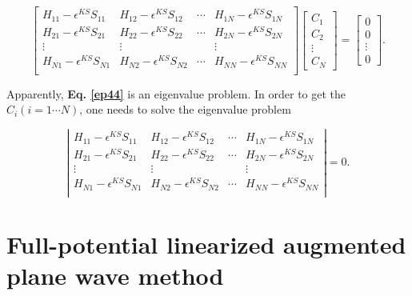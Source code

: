 \documentclass[a4paper, 12pt, titlepage,oneside,drop]{kthesis}
\begin{document}
\begin{equation}\label{ep44}
\left[
\begin{matrix}
    H_{11} - \epsilon^{KS}S_{11} & H_{12} - \epsilon^{KS}S_{12} & \cdots & H_{1N} - \epsilon^{KS}S_{1N} \\
    H_{21} - \epsilon^{KS}S_{21} & H_{22} - \epsilon^{KS}S_{22} & \cdots & H_{2N} - \epsilon^{KS}S_{2N} \\
    \vdots               & \vdots               &        & \vdots               \\
  H_{N1} - \epsilon^{KS}S_{N1} & H_{N2} - \epsilon^{KS}S_{N2} & \cdots & H_{NN} - \epsilon^{KS}S_{NN} \\
\end{matrix} \right] \left[ \begin{array}{c} C_1 \\ C_2 \\ \vdots \\ C_N\end{array} \right]
= \left[ \begin{array}{c} 0 \\ 0 \\ \vdots \\ 0 \end{array} \right].
\end{equation}

Apparently, \textbf{Eq. \ref{ep44}} is an eigenvalue problem. In order to get the $C_{i} (i = 1 \cdots N)$, one needs to solve the eigenvalue problem

\begin{equation}\label{ep4}
\left|
\begin{matrix}
    H_{11} - \epsilon^{KS}S_{11} & H_{12} - \epsilon^{KS}S_{12} & \cdots & H_{1N} - \epsilon^{KS}S_{1N} \\
   H_{21} - \epsilon^{KS}S_{21} & H_{22} - \epsilon^{KS}S_{22} & \cdots & H_{2N} - \epsilon^{KS}S_{2N} \\
    \vdots               & \vdots               &        & \vdots               \\
  H_{N1} - \epsilon^{KS}S_{N1} & H_{N2} - \epsilon^{KS}S_{N2} & \cdots & H_{NN} - \epsilon^{KS}S_{NN} \\
\end{matrix} \right|
 = 0.
\end{equation}

\section{Full-potential linearized augmented plane wave method}\label{fplapwm}
\end{document}
